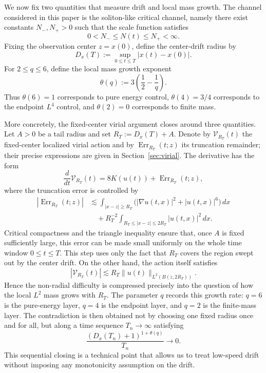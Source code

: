 \documentclass[10pt,a4paper]{amsart}
\numberwithin{equation}{section}
\begin{document}
We now fix two quantities that measure drift and local mass growth. The channel considered in this paper is the soliton-like critical channel, namely there exist constants $N_-,N_+>0$ such that the scale function satisfies
\[
  0<N_-\le N(t)\le N_+<\infty.
\]
Fixing the observation center $z=x(0)$, define the center-drift radius by
\[
  D_x(T):=\sup_{0\le t\le T}|x(t)-x(0)|.
\]
For $2\le q\le6$, define the local mass growth exponent
\[
  \theta(q):=3\left(\frac12-\frac1q\right).
\]
Thus $\theta(6)=1$ corresponds to pure energy control, $\theta(4)=3/4$ corresponds to the endpoint $L^4$ control, and $\theta(2)=0$ corresponds to finite mass.

More concretely, the fixed-center virial argument closes around three quantities. Let $A>0$ be a tail radius and set $R_T:=D_x(T)+A$. Denote by $\mathcal V_{R_T}(t)$ the fixed-center localized virial action and by $\operatorname{Err}_{R_T}(t;z)$ its truncation remainder; their precise expressions are given in Section~\ref{sec:virial}. The derivative has the form
\[
  \frac{d}{dt}\mathcal V_{R_T}(t)
  =8K(u(t))+\operatorname{Err}_{R_T}(t;z),
\]
where the truncation error is controlled by
\begin{align*}
  |\operatorname{Err}_{R_T}(t;z)|
  &\lesssim
  \int_{|x-z|\ge R_T}\bigl(|\nabla u(t,x)|^2+|u(t,x)|^6\bigr)\,dx\\
  &\quad +R_T^{-2}\int_{R_T\le |x-z|\le 2R_T}|u(t,x)|^2\,dx.
\end{align*}
Critical compactness and the triangle inequality ensure that, once $A$ is fixed sufficiently large, this error can be made small uniformly on the whole time window $0\le t\le T$. This step uses only the fact that $R_T$ covers the region swept out by the center drift. On the other hand, the action itself satisfies
\[
  |\mathcal V_{R_T}(t)|
  \lesssim R_T\|u(t)\|_{L^2(B(z,2R_T))}.
\]
Hence the non-radial difficulty is compressed precisely into the question of how the local $L^2$ mass grows with $R_T$. The parameter $q$ records this growth rate: $q=6$ is the pure-energy layer, $q=4$ is the endpoint layer, and $q=2$ is the finite-mass layer. The contradiction is then obtained not by choosing one fixed radius once and for all, but along a time sequence $T_n\to\infty$ satisfying
\[
  \frac{(D_x(T_n)+1)^{1+\theta(q)}}{T_n}\to0.
\]
This sequential closing is a technical point that allows us to treat low-speed drift without imposing any monotonicity assumption on the drift.
\end{document}
